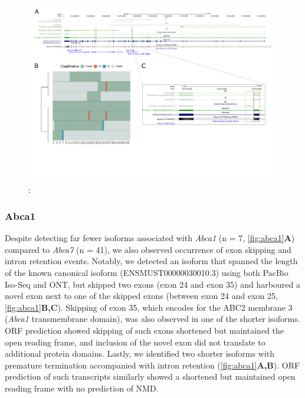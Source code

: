 \begin{landscape}
	\begin{figure}[htp]
		\begin{center}
			\includegraphics[page=2,trim={0 1cm 0 0},scale = 0.85]{Figures/TargetGenes_Annotation_Landscape.pdf}
		\end{center}
		\captionsetup{width=0.95\textwidth}
		\caption[RNA-Seq defined transcriptome]%
		{\textbf{}: }   
		\label{fig:abca7}
	\end{figure}
\end{landscape}

\newpage
\subsubsection{Abca1}
Despite detecting far fewer isoforms associated with \textit{Abca1} (n = 7, \cref{fig:abca1}\textbf{A}) compared to \textit{Abca7} (n = 41), we also observed occurrence of exon skipping and intron retention events. Notably, we detected an isoform that spanned the length of the known canonical isoform (ENSMUST00000030010.3) using both PacBio Iso-Seq and ONT, but skipped two exons (exon 24 and exon 35) and harboured a novel exon next to one of the skipped exons (between exon 24 and exon 25, \cref{fig:abca1}\textbf{B,C}). Skipping of exon 35, which encodes for the ABC2 membrane 3 (\textit{Abca1} transmembrane domain), was also observed in one of the shorter isoforms. ORF prediction showed skipping of such exons shortened but maintained the open reading frame, and inclusion of the novel exon did not translate to additional protein domains. Lastly, we identified two shorter isoforms with premature termination accompanied with intron retention (\cref{fig:abca1}\textbf{A,B}). ORF prediction of such transcripts similarly showed a shortened but maintained open reading frame with no prediction of NMD. 

